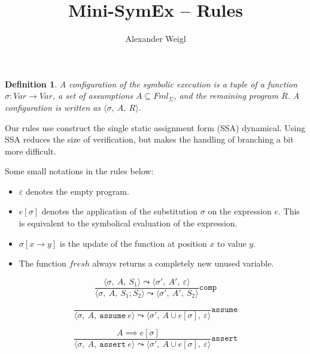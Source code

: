 \documentclass[a4paper]{article}
\newtheorem{definition}{Definition}
\DeclareMathOperator{\semi}{;}
\begin{document}
\author{Alexander Weigl}
\title{Mini-SymEx -- Rules}
\maketitle

\newcommand\config[3]{\langle #1,\:  #2,\: #3 \rangle}

\begin{definition}
  A configuration of the symbolic execution is a tuple of a function
  $\sigma \colon Var \to Var$, a set of assumptions $A \subseteq Fml_\Sigma$,
  and the remaining program $R$.
  A configuration is   written as $\config{\sigma}AR$.
\end{definition}

\def\epsilon{\varepsilon}

Our rules use construct the single static assignment form (SSA) dynamical. Using
SSA reduces the size of verification, but makes the handling of branching a bit
more difficult.

Some small notations in the rules below:
\begin{itemize}
\item $\epsilon$ denotes the empty program.
\item $e[\sigma]$ denotes the application of the substitution $\sigma$ on the
  expression $e$. This is equivalent to the symbolical evaluation of the
  expression.
\item $\sigma[x \to y]$ is the update of the function at position $x$ to value
  $y$.
  
\item The function $fresh$ always returns a completely new unused variable.
\end{itemize}


\begin{equation}
  \label{ex:1}
  \frac%
  {
    \config{\sigma}{A}{S_1} \leadsto \config{\sigma'}{A'}{\epsilon}
  }%
  {
    \config\sigma{A}{S_1\semi S_2}
    \leadsto
    \config{\sigma'}{A'}{S_2}
  }\mathtt{comp}
\end{equation}

\begin{equation}
  \label{ex:1}
  \frac%
  {
    \quad%
  }%
  {
    \config\sigma A{\mathtt{assume}~e}
    \leadsto
    \config{\sigma'}{A \cup e[\sigma]}{\epsilon}
  }\mathtt{assume}
\end{equation}


\begin{equation}
  \label{ex:1}
  \frac%
  {
    A \implies e[\sigma]
    \quad%
  }%
  {
    \config\sigma A{\mathtt{assert}~e}
    \leadsto
    \config{\sigma'}{A \cup e[\sigma]}{\epsilon}
  }\mathtt{assert}
\end{equation}
\end{document}
